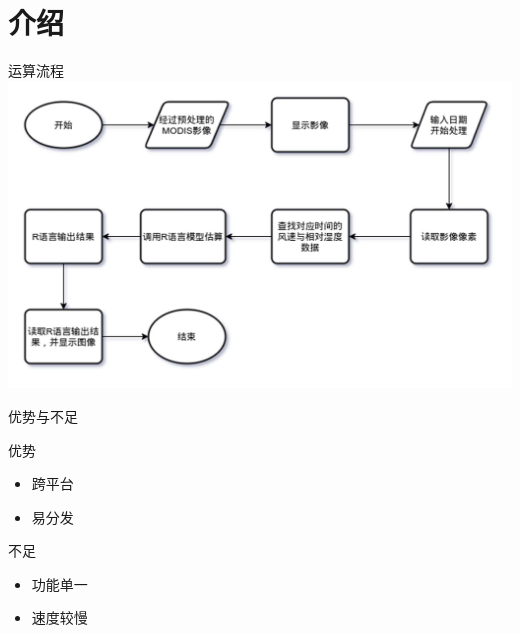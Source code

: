 \documentclass{ctexbeamer}
\begin{document}
\section{介绍}
\begin{frame}{运算流程}
	\includegraphics[width=\textwidth]{运行流程}
\end{frame}
\begin{frame}{优势与不足}
	\begin{block}{优势}
		\begin{itemize}
			\item 跨平台
			\item 易分发
		\end{itemize}
	\end{block}
	\begin{block}{不足}
		\begin{itemize}
			\item 功能单一
			\item 速度较慢
		\end{itemize}
	\end{block}
\end{frame}
\end{document}
